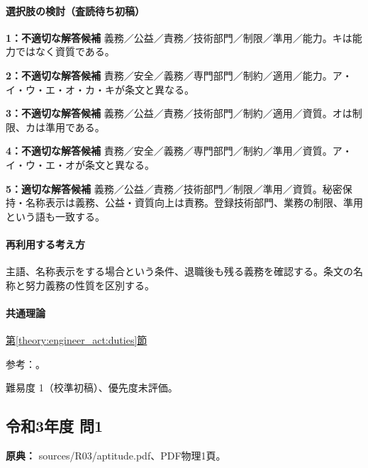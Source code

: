 \paragraph{選択肢の検討（査読待ち初稿）}\mbox{}\par

\noindent\textbf{1：不適切な解答候補} 義務／公益／責務／技術部門／制限／準用／能力。キは能力ではなく資質である。\par

\noindent\textbf{2：不適切な解答候補} 責務／安全／義務／専門部門／制約／適用／能力。ア・イ・ウ・エ・オ・カ・キが条文と異なる。\par

\noindent\textbf{3：不適切な解答候補} 義務／公益／責務／技術部門／制約／適用／資質。オは制限、カは準用である。\par

\noindent\textbf{4：不適切な解答候補} 責務／安全／義務／専門部門／制約／準用／資質。ア・イ・ウ・エ・オが条文と異なる。\par

\noindent\textbf{5：適切な解答候補} 義務／公益／責務／技術部門／制限／準用／資質。秘密保持・名称表示は義務、公益・資質向上は責務。登録技術部門、業務の制限、準用という語も一致する。\par

\paragraph{再利用する考え方} 主語、名称表示をする場合という条件、退職後も残る義務を確認する。条文の名称と努力義務の性質を区別する。

\paragraph{共通理論} \hyperref[theory:engineer_act:duties]{第\ref*{theory:engineer_act:duties}節}

\par 参考：\cite{engineer_act_current}。

\par 難易度 1（校準初稿）、優先度未評価。

\subsection{令和3年度 問1}
\label{q:r03-reg-apt-01}

\noindent\textbf{原典：} sources/R03/aptitude.pdf、PDF物理1頁。

